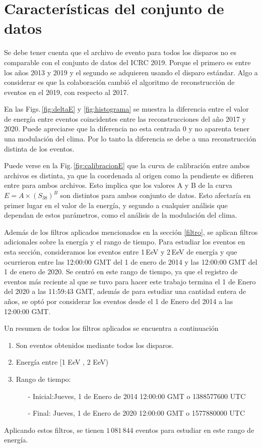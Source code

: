 \section{Características del conjunto de datos} \label{specs}

      Se debe tener cuenta que el archivo de evento para todos los disparos no es comparable con el conjunto  de datos del ICRC 2019. Porque el primero es entre los años 2013 y 2019 y el segundo se adquieren usando el disparo estándar.  Algo a considerar es que la colaboración cambió el algoritmo de reconstrucción de eventos en el 2019, con respecto al 2017.

      En las  Figs.\,\ref{fig:deltaE} y \ref{fig:histograma} se muestra la diferencia entre el valor de energía entre eventos coincidentes entre las reconstrucciones del año 2017 y 2020. Puede apreciarse que la diferencia no esta centrada 0 y no aparenta tener una modulación del clima. Por lo tanto la diferencia se debe a una reconstrucción distinta de los eventos.

      Puede verse en la Fig.\,\ref{fig:calibracionE} que la curva de calibración entre ambos archivos es distinta, ya que la coordenada al origen como la pendiente es difieren entre para ambos archivos. Esto implica que los valores A y B de la curva $E=A\times (S_{38})^B$ son distintos para ambos conjunto de datos. Esto afectaría en primer lugar en el valor de la energía, y segundo a cualquier análisis que dependan de estos parámetros, como el análisis de la modulación del clima.

	Además de los filtros aplicados mencionados en la sección \ref{filtro}, se aplican filtros adicionales sobre la energía y el rango de tiempo. Para estudiar los eventos en esta sección, consideramos los eventos entre 1\,EeV y 2\,EeV de energía y que ocurrieron entre las 12:00:00 GMT del 1 de enero de 2014 y las 12:00:00 GMT del 1 de enero de 2020. Se centró en este rango de tiempo, ya que el registro de eventos más reciente al que se tuvo para hacer este trabajo termina el 1 de Enero del 2020  a las 11:59:43 GMT, además de para estudiar una cantidad entera de años, se optó por considerar los eventos desde el 1 de Enero del 2014 a las 12:00:00 GMT.

	Un resumen de todos los filtros aplicados se encuentra a continuación
		\begin{enumerate}
			\item Son eventos obtenidos mediante todos los disparos.
			\item Energía entre  [1 EeV , 2 EeV)
			\item Rango de tiempo:
			\begin{itemize}
				\item[-] Inicial:Jueves, 1 de Enero de 2014 12:00:00 GMT o 1388577600 UTC
				\item[-] Final:  Jueves, 1 de Enero de 2020 12:00:00 GMT o 1577880000 UTC
			\end{itemize}

		\end{enumerate}
	Aplicando estos filtros, se tienen $1\,081\,844$ eventos para estudiar en este rango de energía. 



